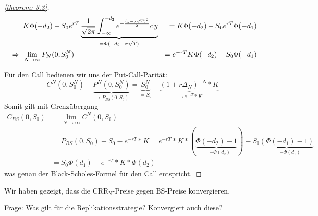 \begin{proof}[\cref{theorem: 3.3}]
	\begin{alignat*}{2}
		&K \Phi(-d_2) - S_0 e^{rT} \underbrace{\frac{1}{\sqrt{2 \pi}} \int_{-\infty}^{-d_2} e^{-\frac{(y-\sigma \sqrt{T})^2}{2}} \mathrm{d}{y}}_{= \Phi(-d_2 - \sigma \sqrt{T})}
		&= K \Phi(-d_2) - S_0 e^{rT} \Phi(-d_1) \\
		\enskip \Rightarrow \enskip &\lim_{N \to \infty} P_N(0,S_0^N) &= e^{-rT} K \Phi(-d_2) - S_0 \Phi(-d_1)
	\end{alignat*}
	
	Für den Call bedienen wir uns der Put-Call-Parität: 
	\begin{equation*}
		C^N(0,S_0^N) - \underbrace{P^N(0,S_0^N)}_{\to P_{BS}(0,S_0)} = \underbrace{S_0^N}_{=S_0} - \underbrace{(1+ r \Delta_N)^{-N} * K}_{\to e^{-cT} * K}
	\end{equation*}
	Somit gilt mit Grenzübergang
	\begin{align*}
		C_{BS}(0,S_0) &= \lim_{N \to \infty} C^N(0,S_0) \\
		&= P_{BS}(0,S_0) + S_0 - e^{-rT} * K = e^{-rT} * K * (\underbrace{\Phi(-d_2) - 1}_{= - \Phi(d_2)}) - S_0 \underbrace{(\Phi(-d_1) - 1)}_{= - \Phi(d_1)} \\
		&= S_0 \Phi(d_1) - e^{-rT} * K * \Phi(d_2)
	\end{align*}
	was genau der Black-Scholes-Formel für den Call entspricht.
\end{proof}

Wir haben gezeigt, dass die $\text{CRR}_\text{N}$-Preise gegen BS-Preise konvergieren.

Frage: Was gilt für die Replikationsstrategie? Konvergiert auch diese?


